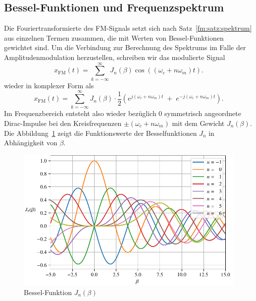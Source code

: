 \subsection{Bessel-Funktionen und Frequenzspektrum}
Die Fouriertransformierte des FM-Signals
setzt sich nach Satz~\ref{fm:satz:spektrum} aus einzelnen
Termen zusammen, die mit Werten von Bessel-Funktionen
gewichtet sind.
Um die Verbindung zur Berechnung des Spektrums im Falle
der Amplitudenmodulation herzustellen, schreiben wir
das modulierte Signal
\[
x_{\text{FM}}(t)
= 
\sum_{k= -\infty}^\infty J_{n}(\beta) \cos((\omega_c+ n\omega_m)t).
\]
wieder in komplexer Form als
\[
x_{\text{FM}}(t)
= 
\sum_{k= -\infty}^\infty
J_{n}(\beta) \cdot \frac{1}{2}
\left(e^{j(\omega_c+ n\omega_m)t}\;+\; e^{-j(\omega_c+ n\omega_m)t}\right).
\]
Im Frequenzbereich entsteht also wieder bezüglich $0$ symmetrisch
angeordnete Dirac-Impulse bei den Kreisfrequenzen $\pm(\omega_c+n\omega_m)$
mit dem Gewicht $J_n(\beta)$.
Die Abbildung~\ref{fig:bessel} zeigt die Funktionswerte der
Besselfunktionen $J_n$ in Abhängigkeit von $\beta$.
\begin{figure}
\centering
\includegraphics{papers/fm/images/bessel.pdf}
\caption{Bessel-Funktion \(J_{n}(\beta)\)}
\label{fig:bessel}
\end{figure}

